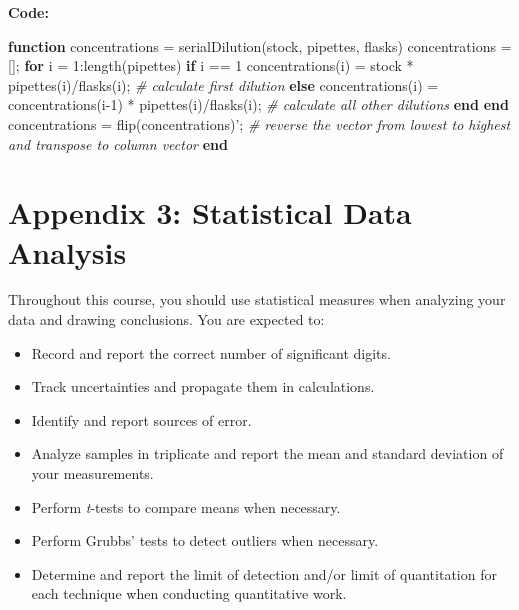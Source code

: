 \documentclass[]{tufte-book}
\newenvironment{Shaded}{}{}
\newcommand{\CommentTok}[1]{\textcolor[rgb]{0.38,0.63,0.69}{\textit{#1}}}
\newcommand{\ControlFlowTok}[1]{\textcolor[rgb]{0.00,0.44,0.13}{\textbf{#1}}}
\newcommand{\FloatTok}[1]{\textcolor[rgb]{0.25,0.63,0.44}{#1}}
\newcommand{\FunctionTok}[1]{\textcolor[rgb]{0.02,0.16,0.49}{#1}}
\newcommand{\NormalTok}[1]{#1}
\newcommand{\OperatorTok}[1]{\textcolor[rgb]{0.40,0.40,0.40}{#1}}
\providecommand{\tightlist}{%
  \setlength{\itemsep}{0pt}\setlength{\parskip}{0pt}}
\begin{document}
\textbf{Code:}

\begin{Shaded}
\begin{Highlighting}[]
\ControlFlowTok{function}\NormalTok{ concentrations }\OperatorTok{=}\NormalTok{ serialDilution(stock}\OperatorTok{,}\NormalTok{ pipettes}\OperatorTok{,}\NormalTok{ flasks)}
\NormalTok{    concentrations }\OperatorTok{=}\NormalTok{[]}\OperatorTok{;}
    \ControlFlowTok{for} \FunctionTok{i} \OperatorTok{=} \FloatTok{1}\OperatorTok{:}\FunctionTok{length}\NormalTok{(pipettes)}
        \ControlFlowTok{if} \FunctionTok{i} \OperatorTok{==} \FloatTok{1}
\NormalTok{            concentrations(}\FunctionTok{i}\NormalTok{) }\OperatorTok{=}\NormalTok{ stock }\OperatorTok{*}\NormalTok{ pipettes(}\FunctionTok{i}\NormalTok{)}\OperatorTok{/}\NormalTok{flasks(}\FunctionTok{i}\NormalTok{)}\OperatorTok{;}  \CommentTok{# calculate first dilution}
        \ControlFlowTok{else}
\NormalTok{            concentrations(}\FunctionTok{i}\NormalTok{) }\OperatorTok{=}\NormalTok{ concentrations(}\FunctionTok{i}\OperatorTok{-}\FloatTok{1}\NormalTok{) }\OperatorTok{*}\NormalTok{ pipettes(}\FunctionTok{i}\NormalTok{)}\OperatorTok{/}\NormalTok{flasks(}\FunctionTok{i}\NormalTok{)}\OperatorTok{;} \CommentTok{# calculate all other dilutions}
        \ControlFlowTok{end}
    \ControlFlowTok{end}
\NormalTok{    concentrations }\OperatorTok{=} \FunctionTok{flip}\NormalTok{(concentrations)}\OperatorTok{';} \CommentTok{# reverse the vector from lowest to highest and transpose to column vector}
\ControlFlowTok{end}
\end{Highlighting}
\end{Shaded}

\hypertarget{appendix-3-statistical-data-analysis}{%
\chapter*{Appendix 3: Statistical Data Analysis}\label{appendix-3-statistical-data-analysis}}

Throughout this course, you should use statistical measures when analyzing your data and drawing conclusions. You are expected to:

\begin{itemize}
\tightlist
\item
  Record and report the correct number of significant digits.
\item
  Track uncertainties and propagate them in calculations.
\item
  Identify and report sources of error.
\item
  Analyze samples in triplicate and report the mean and standard deviation of your measurements.
\item
  Perform \emph{t}-tests to compare means when necessary.
\item
  Perform Grubbs' tests to detect outliers when necessary.
\item
  Determine and report the limit of detection and/or limit of quantitation for each technique when conducting quantitative work.
\end{itemize}
\end{document}
